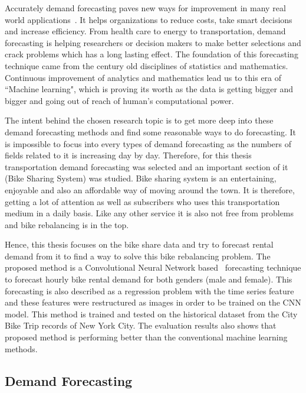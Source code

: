 Accurately demand forecasting paves new ways for improvement in many real world applications~\cite{hart2012demand}. It helps organizations to reduce costs, take smart decisions and increase efficiency. From health care to energy to transportation, demand forecasting is helping researchers or decision makers to make better selections and crack problems which has a long lasting effect. The foundation of this forecasting technique came from the century old disciplines of statistics and mathematics. Continuous improvement of analytics and mathematics lead us to this era of ``Machine learning", which is proving its worth as the data is getting bigger and bigger and going out of reach of human's computational power. 

The intent behind the chosen research topic is to get more deep into these demand forecasting methods and find some reasonable ways to do forecasting. It is impossible to focus into every types of demand forecasting as the numbers of fields related to it is increasing day by day. Therefore, for this thesis transportation demand forecasting was selected and an important section of it (Bike Sharing System) was studied. Bike sharing system is an entertaining, enjoyable and also an affordable way of moving around the town. It is therefore, getting a lot of attention as well as subscribers who uses this transportation medium in a daily basis. Like any other service it is also not free from problems and bike rebalancing is in the top. 

Hence, this thesis focuses on the bike share data and try to forecast rental demand from it to find a way to solve this bike rebalancing problem. The proposed method is a Convolutional Neural Network based~\cite{krizhevsky2012imagenet} forecasting technique to forecast hourly bike rental demand for both genders (male and female). This forecasting is also described as a regression problem with the time series feature and these features were restructured as images in order to be trained on the CNN model. This method is trained and tested on the historical dataset from the City Bike Trip records of New York City. The evaluation results also shows that proposed method is performing better than the conventional machine learning methods.  




\subsection{Demand Forecasting}
\label{DF}


